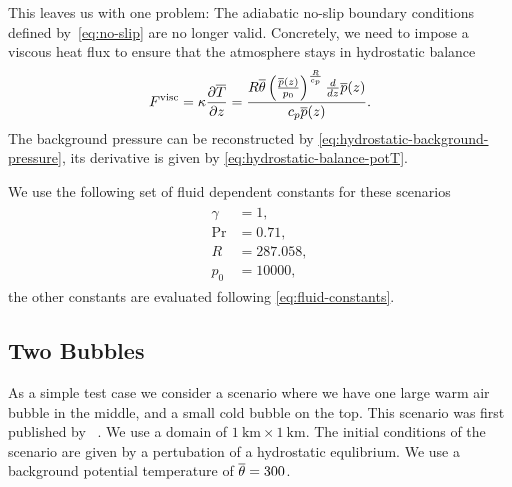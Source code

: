 This leaves us with one problem:
The adiabatic no-slip boundary conditions defined by~\vref{eq:no-slip} are no longer valid.
Concretely, we need to impose a viscous heat flux to ensure that the atmosphere stays in hydrostatic balance~\cite{giraldo2008study}
\begin{equation}
  \label{eq:atmosphere-bc}
  F^\text{visc} = \kappa \pdv{\overline{T}}{z} =
\frac{R \overline{\theta} \left(\frac{\overline{p}{\left (z \right )}}{p_{0}}\right)^{\frac{R}{c_{p}}} \frac{d}{d z} \overline{p}{\left (z \right )}}{c_{p} \overline{p}{\left (z \right )}}.
\end{equation}
The background pressure can be reconstructed by \cref{eq:hydrostatic-background-pressure}, its derivative is given by \cref{eq:hydrostatic-balance-potT}.

We use the following set of fluid dependent constants for these scenarios
\begin{align}
  \begin{split}
    \gamma &= 1, \\
    \Pr &=  0.71, \\
    R &= 287.058, \\
    p_0 &= 10000,
  \end{split}
\end{align}
the other constants are evaluated following \cref{eq:fluid-constants}.

\subsection{Two Bubbles}
As a simple test case we consider a scenario where we have one large warm air bubble in the middle, and a small cold bubble on the top.
This scenario was first published by \citeauthor{robert1993bubble}~\cite{robert1993bubble}.
We use a domain of $\SI{1}{\km} \times \SI{1}{\km}$.
The initial conditions of the scenario are given by a pertubation of a hydrostatic equlibrium.
We use a background potential temperature of $\overline{\theta} = 300$.

